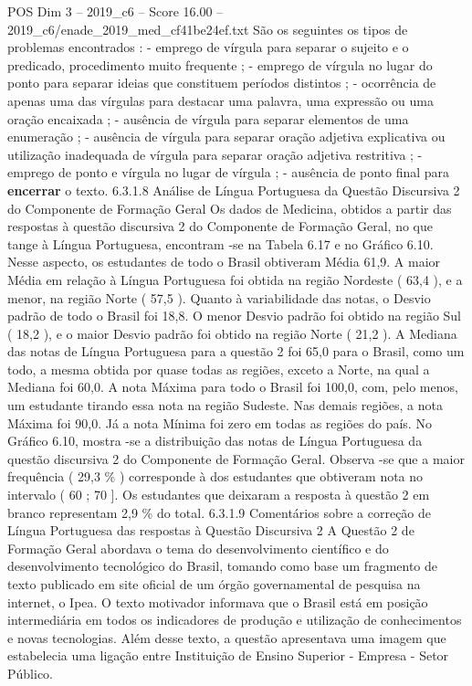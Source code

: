 \begin{textsample}{POS Dim 3 – 2019\_c6 – Score 16.00 – 2019\_c6/enade\_2019\_med\_cf41be24ef.txt}
São os seguintes os tipos de problemas encontrados : - emprego de vírgula para separar o sujeito e o predicado, procedimento muito frequente ; - emprego de vírgula no lugar do ponto para separar ideias que constituem períodos distintos ; - ocorrência de apenas uma das vírgulas para destacar uma palavra, uma expressão ou uma oração encaixada ; - ausência de vírgula para separar elementos de uma enumeração ; - ausência de vírgula para separar oração adjetiva explicativa ou utilização inadequada de vírgula para separar oração adjetiva restritiva ; - emprego de ponto e vírgula no lugar de vírgula ; - ausência de ponto final para \textbf{encerrar} o texto. 6.3.1.8 Análise de Língua Portuguesa da Questão Discursiva 2 do Componente de Formação Geral Os dados de Medicina, obtidos a partir das respostas à questão discursiva 2 do Componente de Formação Geral, no que tange à Língua Portuguesa, encontram -se na Tabela 6.17 e no Gráfico 6.10.
Nesse aspecto, os estudantes de todo o Brasil obtiveram Média 61,9.
A maior Média em relação à Língua Portuguesa foi obtida na região Nordeste ( 63,4 ), e a menor, na região Norte ( 57,5 ).
Quanto à variabilidade das notas, o Desvio padrão de todo o Brasil foi 18,8.
O menor Desvio padrão foi obtido na região Sul ( 18,2 ), e o maior Desvio padrão foi obtido na região Norte ( 21,2 ).
A Mediana das notas de Língua Portuguesa para a questão 2 foi 65,0 para o Brasil, como um todo, a mesma obtida por quase todas as regiões, exceto a Norte, na qual a Mediana foi 60,0.
A nota Máxima para todo o Brasil foi 100,0, com, pelo menos, um estudante tirando essa nota na região Sudeste.
Nas demais regiões, a nota Máxima foi 90,0.
Já a nota Mínima foi zero em todas as regiões do país.
No Gráfico 6.10, mostra -se a distribuição das notas de Língua Portuguesa da questão discursiva 2 do Componente de Formação Geral.
Observa -se que a maior frequência ( 29,3 \% ) corresponde à dos estudantes que obtiveram nota no intervalo ( 60 ; 70 ].
Os estudantes que deixaram a resposta à questão 2 em branco representam 2,9 \% do total. 6.3.1.9 Comentários sobre a correção de Língua Portuguesa das respostas à Questão Discursiva 2 A Questão 2 de Formação Geral abordava o tema do desenvolvimento científico e do desenvolvimento tecnológico do Brasil, tomando como base um fragmento de texto publicado em site oficial de um órgão governamental de pesquisa na internet, o Ipea.
O texto motivador informava que o Brasil está em posição intermediária em todos os indicadores de produção e utilização de conhecimentos e novas tecnologias.
Além desse texto, a questão apresentava uma imagem que estabelecia uma ligação entre Instituição de Ensino Superior - Empresa - Setor Público.

\end{textsample}
